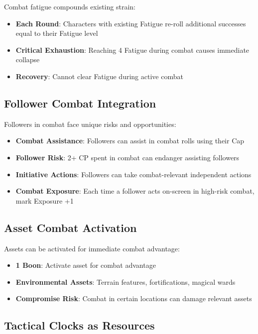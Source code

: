 Combat fatigue compounds existing strain:

\begin{itemize}
    \item \textbf{Each Round}: Characters with existing Fatigue re-roll additional successes equal to their Fatigue level
    \item \textbf{Critical Exhaustion}: Reaching 4 Fatigue during combat causes immediate collapse
    \item \textbf{Recovery}: Cannot clear Fatigue during active combat
\end{itemize}

\subsection*{Follower Combat Integration}

Followers in combat face unique risks and opportunities:

\begin{itemize}
    \item \textbf{Combat Assistance}: Followers can assist in combat rolls using their Cap
    \item \textbf{Follower Risk}: 2+ CP spent in combat can endanger assisting followers
    \item \textbf{Initiative Actions}: Followers can take combat-relevant independent actions
    \item \textbf{Combat Exposure}: Each time a follower acts on-screen in high-risk combat, mark Exposure +1
\end{itemize}

\subsection*{Asset Combat Activation}

Assets can be activated for immediate combat advantage:

\begin{itemize}
    \item \textbf{1 Boon}: Activate asset for combat advantage
    \item \textbf{Environmental Assets}: Terrain features, fortifications, magical wards
    \item \textbf{Compromise Risk}: Combat in certain locations can damage relevant assets
\end{itemize}

\subsection*{Tactical Clocks as Resources}

